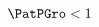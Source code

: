 \begin{equation}\begin{gathered}\begin{aligned}
  \PatPGro &  < 1   \label{eq:GICRaw}
\end{aligned}\end{gathered}\end{equation}
